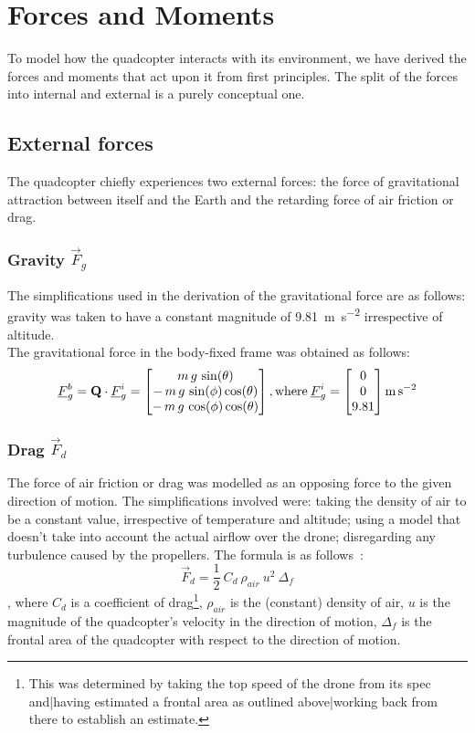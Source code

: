 \section{Forces and Moments}


To model how the quadcopter interacts with its environment, we have derived the forces and moments that act upon it from first principles. The split of the forces into internal and external is a purely conceptual one.
\subsection{External forces}
The quadcopter chiefly experiences two external forces: the force of gravitational attraction between itself and the Earth and the retarding force of air friction or drag.
\subsubsection{Gravity $\vec{F}_g$}
The simplifications used in the derivation of the gravitational force are as follows: gravity was taken to have a constant magnitude of  \SI{9.81}{\metre\per\second\squared} irrespective of altitude.
\\
The gravitational force in the body-fixed frame was obtained as follows:
$$
\underline{F}_g^b = \textbf{Q}\cdot\underline{F}_g^i = \begin{bmatrix}
m\,g\,\sin(\theta)\\-\,m\,g\,\sin(\phi)\cos(\theta)\\-\,m\,g\,\cos(\phi)\cos(\theta)
\end{bmatrix}
\mathrm{, where }\:
\underline{F}_g^i = \begin{bmatrix}
0\\0\\9.81
\end{bmatrix}
\si{\metre\per\second\squared}
$$
\subsubsection{Drag $\vec{F}_d$}
The force of air friction or drag was modelled as an opposing force to the given direction of motion. The simplifications involved were: taking the density of air to be a constant value, irrespective of temperature and altitude; using a model that doesn't take into account the actual airflow over the drone; disregarding any turbulence caused by the propellers. The formula is as follows~:
\begin{equation}
\label{eqn:drag}
\vec{F}_d = \frac{1}{2}\:C_d\:\rho_{air}\:u^2\:\Delta_f
\end{equation}
, where $C_d$ is a coefficient of drag\footnote{This was determined by taking the top speed of the drone from its spec \cite{drone-spec} and|having estimated a frontal area as outlined above|working back from there to establish an estimate. }, $\rho_{air}$ is the (constant) density of air, $u$ is the magnitude of the quadcopter's velocity in the direction of motion, $\Delta_f$ is the frontal area of the quadcopter with respect to the direction of motion.

